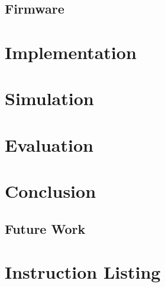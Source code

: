 \documentclass[oneside]{book}
\begin{document}

\section{Firmware}




\chapter{Implementation}


\chapter{Simulation}


\chapter{Evaluation}


\chapter{Conclusion}

\section{Future Work}


\appendix

\chapter{Instruction Listing}


\end{document}
